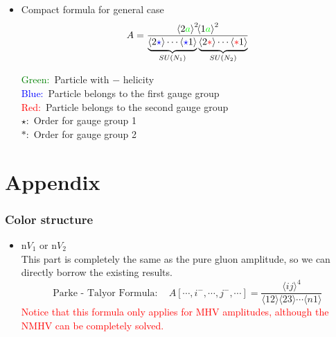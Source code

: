 \documentclass{beamer}
\newcommand{\avg}[1]{\langle #1 \rangle}
\newcommand{\asqu}[1]{{\langle#1\rangle}^2}
\begin{document}
\begin{frame}
    \begin{itemize}
        \item Compact formula for general case
        \begin{equation*}
            A=\frac{\asqu{2\textcolor{green}{a}}\!\asqu{1\textcolor{green}{a}}}{\underbrace{\avg{2\textcolor{blue}{\star}}\cdots \avg{\textcolor{blue}{\star}1}}_{SU(N_1)}\underbrace{\avg{2\textcolor{red}{\ast} }\cdots \avg{\textcolor{red}{\ast} 1}}_{SU(N_2)}}
        \end{equation*} 
        \begin{minipage}{0.7\textwidth}
            \raggedright  %
            \textcolor{green}{Green:} \,Particle with $-$ helicity\\
            \textcolor{blue}{Blue:}\, Particle belongs to the first gauge group\\
            \textcolor{red}{Red:}\, Particle belongs to the second gauge group\\
            $\star$: \,Order for gauge group 1\\
            $\ast$: \,Order for gauge group 2 
            \end{minipage}
       
    \end{itemize}
\end{frame}

\appendix
\section{Appendix}
\begin{frame}
    \frametitle{Color structure}
    \begin{itemize}
        \item n$ V_1$ or n$V_2$\\
        This part is completely the same as the pure gluon amplitude, so we can directly borrow the
        existing results.
        \begin{equation*}
            \boxed{\text{Parke - Talyor Formula}:\quad A[\cdots,i^-,\cdots,j^-,\cdots]=\frac{\avg{ij}^4}{\avg{12}\!\avg{23}\cdots\avg{n1}}}
        \end{equation*}
        \textcolor{red}{Notice that this formula only applies for MHV amplitudes, although the NMHV can be completely solved.}
    \end{itemize}
\end{frame}
\end{document}
